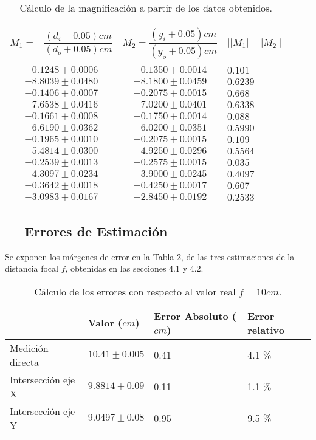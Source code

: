 \documentclass[10pt,a4paper]{article}
\begin{document}
\begin{table}[ht]
\centering
\caption{Cálculo de la magnificación a partir de los datos obtenidos.}	
\begin{tabular}{|c|c|l|}
\hline &&\\
$M_1=-\dfrac{(d_i \pm 0.05) cm}{(d_o \pm 0.05)cm}$ & $M_2=\dfrac{(y_i \pm 0.05) cm}{(y_o \pm 0.05)cm}$ & $\left||M_1|-|M_2|\right|$ \\ &&\\ \hline
$-0.1248\pm0.0006$ & $-0.1350\pm0.0014$ &  $0.101$ \\ \hline
$-8.8039\pm0.0480$ & $-8.1800\pm0.0459$ &  $0.6239$ \\ \hline
$-0.1406\pm0.0007$ & $-0.2075\pm0.0015$ &  $0.668$ \\ \hline
$-7.6538\pm0.0416$ & $-7.0200\pm0.0401$ &   $0.6338$ \\ \hline
$-0.1661\pm0.0008$ & $-0.1750\pm0.0014$ &   $0.088$ \\ \hline
$-6.6190\pm0.0362$ & $-6.0200\pm0.0351$ &   $0.5990$ \\ \hline
$-0.1965\pm0.0010$ & $-0.2075\pm0.0015$ &   $0.109$ \\ \hline
$-5.4814\pm0.0300$ & $-4.9250\pm0.0296$ &   $0.5564$ \\ \hline
$-0.2539\pm0.0013$ & $-0.2575\pm0.0015$ &  $0.035$ \\ \hline
$-4.3097\pm 0.0234$ & $-3.9000\pm0.0245$ &  $0.4097$ \\ \hline
$-0.3642\pm0.0018$ & $-0.4250\pm0.0017$ &  $0.607$ \\ \hline
$-3.0983\pm0.0167$ & $-2.8450\pm0.0192$ &  $0.2533$ \\ \hline
\end{tabular}
\label{tab:magnificacion}
\end{table}	

\subsection{--- Errores de Estimación ---} %
\label{sub:errores}
Se exponen los márgenes de error en la Tabla \ref{tab:errores}, de las tres estimaciones de la distancia focal \(f\), obtenidas en las secciones 4.1 y 4.2.
\begin{table}[ht]
	\centering
	\caption{Cálculo de los errores con respecto al valor real \(f=10cm\).}
	\begin{tabular}{|*{4} {l|}}
		\hline 
		 & Valor (\(cm\)) & Error Absoluto (\(cm\)) & Error relativo \\ \hline
		Medición directa & \(10.41 \pm 0.005\) & 0.41 & 4.1 \textsc{\%} \\ \hline
		Intersección eje X & \(9.8814 \pm 0.09\) & 0.11 & 1.1 \textsc{\%} \\ \hline
		Intersección eje Y & \(9.0497 \pm 0.08\) & 0.95 & 9.5 \textsc{\%} \\ \hline
	\end{tabular}
	\label{tab:errores}
\end{table}
\end{document}
